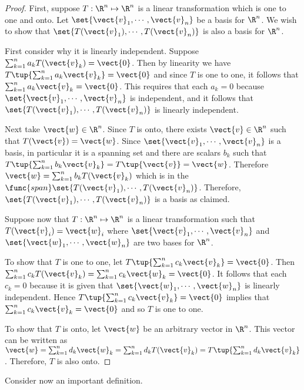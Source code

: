 \begin{proof}
First, suppose $T:\R^n \mapsto \R^n$ is a linear
transformation which is one to one and onto. Let $\set{
\vect{v}_{1},\cdots ,\vect{v}_{n}} $ be a basis for
$\R^n$. We wish to show that $\set{T(\vect{v}_{1}),\cdots ,
T(\vect{v}_{n})} $ is also a basis for $\R^n$. 

First consider why it is linearly independent. Suppose
$\sum_{k=1}^{n}a_{k}T(\vect{v}_{k})=\vect{0}$. Then by linearity we have $T\tup{
\sum_{k=1}^{n}a_{k}\vect{v}_{k}} =\vect{0}$ and since $T$ is one
to one, it follows that $\sum_{k=1}^{n}a_{k}\vect{v}_{k}=\vect{0}$.
This requires that  each $a_{k}=0$ because $\set{\vect{v}_{1},\cdots,
\vect{v}_{n}} $ is independent, and it follows that $\set{
T(\vect{v}_{1}),\cdots , T(\vect{v}_{n})} $ is linearly
independent. 


Next take $\vect{w}\in \R^n$. Since $T$ is onto,
there exists $\vect{v}\in \R^n$ such that
$T(\vect{v})=\vect{w}$. Since $ \set{\vect{v}_{1},\cdots
,\vect{v}_{n}} $ is a basis, in particular it is a spanning set
and there are scalars $b_{k}$ such that $T\tup{
\sum_{k=1}^{n}b_{k}\vect{v} _{k}} =T\tup{\vect{v}}
=\vect{w}$. Therefore $\vect{w} =\sum_{k=1}^{n}b_{k}T(\vect{v}_{k})$
which is in the $\func{span}\set{T(\vect{v}_{1}),\cdots ,
T(\vect{v}_{n})}$. Therefore, $\set{T(\vect{v}_{1}),\cdots
,T(\vect{v}_{n}) } $ is a basis as claimed.

Suppose now that $T: \R^n \mapsto \R^n$ is a linear
transformation such that $T(\vect{v}_{i})=\vect{w}_{i}$ where
$\set{\vect{v} _{1},\cdots ,\vect{v}_{n}} $ and $\set{
\vect{w}_{1},\cdots , \vect{w}_{n}} $ are two bases for
$\R^n$. 

To show that $T$ is one to one, let $T\tup{
\sum_{k=1}^{n}c_{k}\vect{v}_{k}} =\vect{0}$. Then
$\sum_{k=1}^{n}c_{k}T(\vect{v}_{k})=\sum_{k=1}^{n}c_{k}\vect{w}_{k}=\vect{
0}$. It follows that each $c_{k} = 0$ because it is given that
$\set{\vect{w} _{1},\cdots ,\vect{w}_{n}} $ is linearly
independent. Hence $T\tup{\sum_{k=1}^{n}c_{k}\vect{v}_{k}}
=\vect{0}$ implies that $\sum_{k=1}^{n}c_{k}\vect{v}_{k}=\vect{0}$ and
so $T$ is one to one.  

To show that $T$ is onto, let $\vect{w}$ be an arbitrary vector in
$\R^n$. This vector can be written as $\vect{w} =
\sum_{k=1}^{n}d_k\vect{w}_k =
\sum_{k=1}^{n}d_{k}T(\vect{v}_{k})=T\tup{\sum_{k=1}^{n}d_{k}
\vect{v}_{k}}$.  Therefore, $T$ is also onto. 
\end{proof}

Consider now an important definition.

